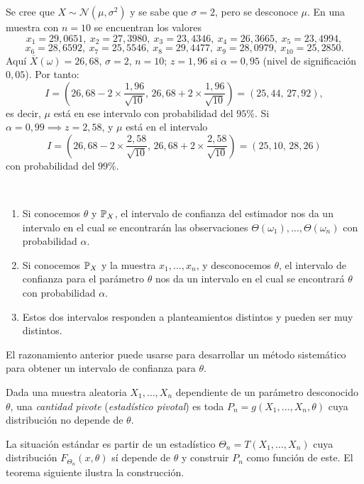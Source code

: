 \begin{ejemplo}[26]
Se cree que $X \sim \mathcal{N}(\mu, \sigma^2)$ y se sabe que $\sigma = 2$, pero se desconoce $\mu$. En una muestra con $n = 10$ se encuentran los valores
\[
  x_1 = 29{,}0651,\ x_2 = 27{,}3980,\ x_3 = 23{,}4346,\ x_4 = 26{,}3665,\ x_5 = 23{,}4994,
\]
\[
  x_6 = 28{,}6592,\ x_7 = 25{,}5546,\ x_8 = 29{,}4477,\ x_9 = 28{,}0979,\ x_{10} = 25{,}2850.
\]
Aquí $\overline{X}(\omega) = 26{,}68$, $\sigma = 2$, $n = 10$; $z = 1{,}96$ si $\alpha = 0{,}95$ (nivel de significación $0{,}05$). Por tanto:
\[
  I = \left(26{,}68 - 2 \times \frac{1{,}96}{\sqrt{10}},\, 26{,}68 + 2 \times \frac{1{,}96}{\sqrt{10}}\right) = (25{,}44,\, 27{,}92),
\]
es decir, $\mu$ está en ese intervalo con probabilidad del $95\%$. Si $\alpha = 0{,}99 \implies z = 2{,}58$, y $\mu$ está en el intervalo
\[
  I = \left(26{,}68 - 2 \times \frac{2{,}58}{\sqrt{10}},\, 26{,}68 + 2 \times \frac{2{,}58}{\sqrt{10}}\right) = (25{,}10,\, 28{,}26)
\]
con probabilidad del $99\%$.
\end{ejemplo}

\begin{observacion}[33] \,
\begin{enumerate}
  \item Si conocemos $\theta$ y $\mathbb{P}_X$, el intervalo de confianza del estimador nos da un intervalo en el cual se encontrarán las observaciones $\Theta(\omega_1), \dots, \Theta(\omega_n)$ con probabilidad $\alpha$.
  \item Si conocemos $\mathbb{P}_X$ y la muestra $x_1, \dots, x_n$, y desconocemos $\theta$, el intervalo de confianza para el parámetro $\theta$ nos da un intervalo en el cual se encontrará $\theta$ con probabilidad $\alpha$.
  \item Estos dos intervalos responden a planteamientos distintos y pueden ser muy distintos.
\end{enumerate}
El razonamiento anterior puede usarse para desarrollar un método sistemático para obtener un intervalo de confianza para $\theta$.
\end{observacion}

\begin{definicion}
Dada una muestra aleatoria $X_1, \dots, X_n$ dependiente de un parámetro desconocido $\theta$, una \emph{cantidad pivote} (\emph{estadístico pivotal}) es toda $P_n = g(X_1, \dots, X_n, \theta)$ cuya distribución no depende de $\theta$.

La situación estándar es partir de un estadístico $\Theta_n = T(X_1, \dots, X_n)$ cuya distribución $F_{\Theta_n}(x, \theta)$ sí depende de $\theta$ y construir $P_n$ como función de este. El teorema siguiente ilustra la construcción.
\end{definicion}

